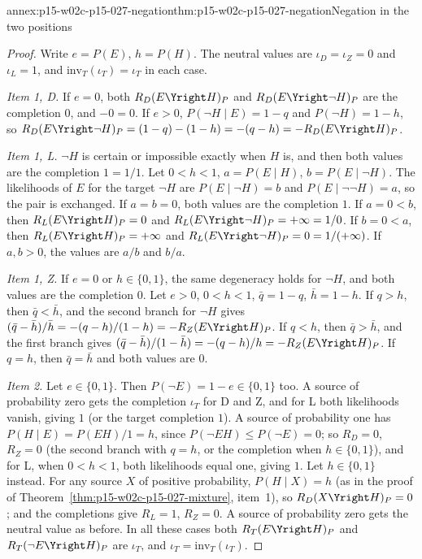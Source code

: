 \begin{annexitem}{annex:p15-w02c-p15-027-negation}{thm:p15-w02c-p15-027-negation}{Negation in the two positions}
\begin{proof}
Write \(e=P(E)\), \(h=P(H)\). The neutral values are \(\iota_D=\iota_Z=0\)
and \(\iota_L=1\), and \(\mathrm{inv}_T(\iota_T)=\iota_T\) in each case.

\emph{Item 1, D.} If \(e=0\), both \(R_D(E\Yright H)_P\) and
\(R_D(E\Yright\neg H)_P\) are the completion \(0\), and \(-0=0\). If
\(e>0\), \(P(\neg H\mid E)=1-q\) and \(P(\neg H)=1-h\), so
\(R_D(E\Yright\neg H)_P=(1-q)-(1-h)=-(q-h)=-R_D(E\Yright H)_P\).

\emph{Item 1, L.} \(\neg H\) is certain or impossible exactly when \(H\)
is, and then both values are the completion \(1=1/1\). Let \(0<h<1\),
\(a=P(E\mid H)\), \(b=P(E\mid\neg H)\). The likelihoods of \(E\) for
the target \(\neg H\) are \(P(E\mid\neg H)=b\) and
\(P(E\mid\neg\neg H)=a\), so the pair is exchanged. If \(a=b=0\), both
values are the completion \(1\). If \(a=0<b\), then
\(R_L(E\Yright H)_P=0\) and \(R_L(E\Yright\neg H)_P=+\infty=1/0\). If
\(b=0<a\), then \(R_L(E\Yright H)_P=+\infty\) and
\(R_L(E\Yright\neg H)_P=0=1/(+\infty)\). If \(a,b>0\), the values are
\(a/b\) and \(b/a\).

\emph{Item 1, Z.} If \(e=0\) or \(h\in\{0,1\}\), the same degeneracy
holds for \(\neg H\), and both values are the completion \(0\). Let
\(e>0\), \(0<h<1\), \(\bar q=1-q\), \(\bar h=1-h\). If \(q>h\), then
\(\bar q<\bar h\), and the second branch for \(\neg H\) gives
\((\bar q-\bar h)/\bar h=-(q-h)/(1-h)=-R_Z(E\Yright H)_P\). If \(q<h\),
then \(\bar q>\bar h\), and the first branch gives
\((\bar q-\bar h)/(1-\bar h)=-(q-h)/h=-R_Z(E\Yright H)_P\). If \(q=h\),
then \(\bar q=\bar h\) and both values are \(0\).

\emph{Item 2.} Let \(e\in\{0,1\}\). Then \(P(\neg E)=1-e\in\{0,1\}\)
too. A source of probability zero gets the completion \(\iota_T\) for D
and Z, and for L both likelihoods vanish, giving \(1\) (or the target
completion \(1\)). A source of probability one has
\(P(H\mid E)=P(EH)/1=h\), since \(P(\neg E H)\leq P(\neg E)=0\); so
\(R_D=0\), \(R_Z=0\) (the second branch with \(q=h\), or the completion
when \(h\in\{0,1\}\)), and for L, when \(0<h<1\), both likelihoods
equal one, giving \(1\). Let \(h\in\{0,1\}\) instead. For any source
\(X\) of positive probability, \(P(H\mid X)=h\) (as in the proof of
Theorem~\ref{thm:p15-w02c-p15-027-mixture}, item~1), so
\(R_D(X\Yright H)_P=0\); and the completions give \(R_L=1\), \(R_Z=0\).
A source of probability zero gets the neutral value as before. In all
these cases both \(R_T(E\Yright H)_P\) and \(R_T(\neg E\Yright H)_P\)
are \(\iota_T\), and \(\iota_T=\mathrm{inv}_T(\iota_T)\).


\end{proof}
\end{annexitem}
